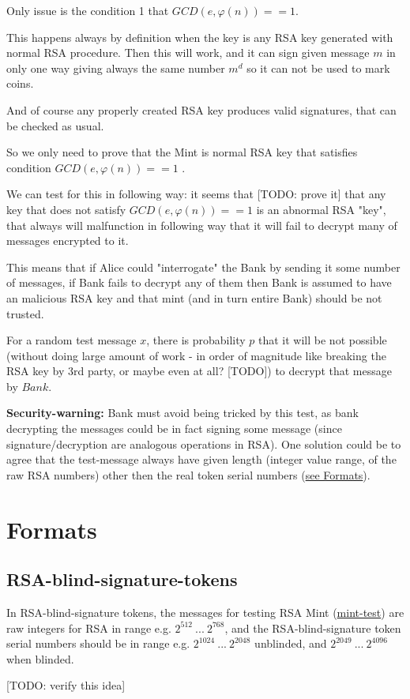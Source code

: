\documentclass[a4paper,11pt]{article}
\begin{document}
Only issue is the condition 1 that $GCD(e,\varphi(n))==1$.


This happens always by definition when the key is any RSA key generated with normal RSA procedure. 
Then this will work, and it can sign given message $m$ in only one way giving
always the same number $m^{d}$ so it can not be used to mark coins.

And of course any properly created RSA key produces valid signatures, that can be checked as usual.

So we only need to prove that the Mint is normal RSA key that satisfies condition $GCD(e,\varphi(n))==1$ .

We can test for this in following way: it seems that [TODO: prove it] that any key that does not satisfy $GCD(e,\varphi(n))==1$ is an abnormal RSA "key", 
that always will malfunction in following way that it will fail to decrypt many of messages encrypted to it.

This means that if Alice could "interrogate" the Bank by sending it some number of messages, if Bank fails to decrypt any of them
then Bank is assumed to have an malicious RSA key and that mint (and in turn entire Bank) should be not trusted.

For a random test message $x$, there is probability $p$ that it will be not possible (without doing large amount of work - in order of magnitude like breaking the RSA key by 3rd party,
or maybe even at all? [TODO]) to decrypt that message by $Bank$.

\textbf{Security-warning:} Bank must avoid being tricked by this test, as bank decrypting the messages could be in fact signing some message (since signature/decryption are analogous operations in RSA).
One solution could be to agree that the test-message always have given length (integer value range, of the raw RSA numbers) 
other then the real token serial numbers (\hyperref[sec:formats_RSA-blind-signature-tokens]{see Formats}).





\section{Formats}

\subsection{RSA-blind-signature-tokens}

\label{sec:formats_RSA-blind-signature-tokens}

In RSA-blind-signature tokens, the messages for testing RSA Mint (\hyperref[sec:crypto_mint-test]{mint-test}) 
are raw integers for RSA in range e.g. $2^{512}\ ...\ 2^{768}$, \newline
and the RSA-blind-signature token serial numbers should be in range e.g. $2^{1024}\ ...\ 2^{2048}$ unblinded, \newline
and $2^{2049}\ ...\ 2^{4096}$ when blinded.

[TODO: verify this idea]
\end{document}
